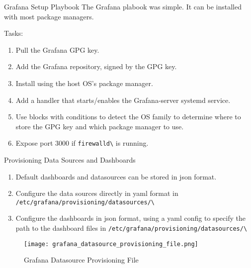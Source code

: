 \documentclass[14pt,compress,usenames,dvipsnames,aspectratio=169]{beamer}
\begin{document}
\begin{frame}{Grafana Setup Playbook}
The Grafana plabook was simple. It can be installed with most package managers.  

    Tasks:
    \begin{enumerate}
        \item{Pull the Grafana GPG key.} 
        \item{Add the Grafana repository, signed by the GPG key.}
        \item{Install using the host OS's package manager.}
        \item{Add a handler that starts/enables the Grafana-server systemd service.}
        \item{Use blocks with conditions to detect the OS family to determine where
            to store the GPG key and which package manager to use.}
        \item{Expose port 3000 if \verb+firewalld\+ is running.}
    \end{enumerate}
\end{frame}


\begin{frame}{Provisioning Data Sources and Dashboards}
    \begin{enumerate}
        \item{Default dashboards and datasources can be stored in json format.}
        \item{Configure the data sources directly in yaml format in
            \verb+/etc/grafana/provisioning/datasources/\+}
        \item{Configure the dashboards in json format, using a yaml config to 
                specify the path to the dashboard files in 
                \verb+/etc/grafana/provisioning/datasources/\+}
    \end{enumerate}
\end{frame}

\begin{figure}
    \centering
    \texttt{[image: grafana\_datasource\_provisioning\_file.png]}
    \caption{Grafana Datasource Provisioning File}
    \label{fig:enter-label}
\end{figure}
\end{document}
